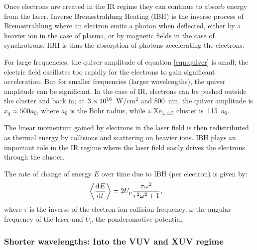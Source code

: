 
Once electrons are created in the IR regime they can continue to absorb energy
from the laser.
Inverse Bremsstrahlung Heating (IBH) is the inverse process of Bremsstrahlung
where an electron emits a photon when deflected, either by a heavier ion in the
case of plasma, or by magnetic fields in the case of synchrotrons. IBH is thus
the absorption of photons accelerating the electrons\cite{Schlessinger1979}.

For large frequencies, the quiver amplitude of equation \eqref{eqn:quiver} is
small; the electric field oscillates
too rapidly for the electrons to gain significant acceleration.
But for smaller frequencies (larger wavelengths), the quiver amplitude can
be significant. In the case of IR, electrons can be pushed outside the cluster
and back in; at $\ten{3}{16}$~W/cm$^2$ and 800~nm, the quiver
amplitude is $x_q \approx 500 a_0$, where $a_0$ is the Bohr
radius\cite{Georgescu2007}, while a Xe$_{1,415}$ cluster is~115~$a_0$.

The linear momentum gained by electrons in the laser field is then redistributed
as thermal energy by collisions and scattering on heavier ions.
IBH plays an important role in the IR regime where the laser field easily
drives the electrons through the cluster\cite{Fennel2010}.

The rate of change of energy $E$ over time due to IBH (per electron) is
given\cite{Fennel2010} by:
\begin{align}
\left< \frac{\textrm{d}^{{}} {E}}{\textrm{d} t^{{}}} \right> & = 2 U_p \frac{\tau \omega^2}{\tau^2 \omega^2 + 1},
\end{align}
where $\tau$ is the inverse of the electron-ion collision frequency, $\omega$ the
angular frequency of the laser and $U_p$ the ponderomotive potential.


\subsubsection{Shorter wavelengths: Into the VUV and XUV regime}
\label{section:intro:mechanisms:vuv}


